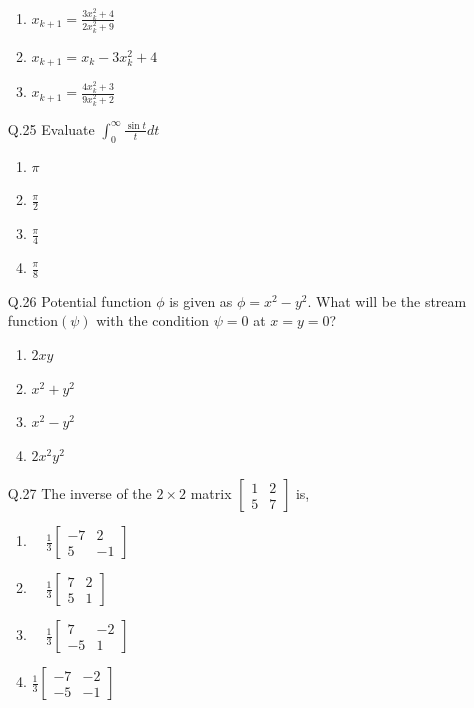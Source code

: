 \documentclass[journal,12pt,onecolumn]{IEEEtran}
\theoremstyle{remark}
\begin{document}
\begin{enumerate}
\begin{enumerate}
		\item $x_{k+1}=\frac{3x_k^2+4}{2x_k^2+9}$
		\item $x_{k+1}=x_k-3x_k^2+4$
		\item $x_{k+1}=\frac{4x_k^2+3}{9x_k^2+2}$
        \end{enumerate}   
\item[Q.25] Evaluate $\int_0^{\infty}\frac{\sin t}{t} dt$
	\begin{enumerate}
                \item $\pi$
		\item $\frac{\pi}{2}$
		\item $\frac{\pi}{4}$
		\item $\frac{\pi}{8}$  
        \end{enumerate}
\item[Q.26] Potential function $\phi$ is given as $\phi=x^2-y^2$. What will be the stream function$(\psi)$ with the condition $\psi=0$ at $x=y=0$?
	\begin{enumerate}
                \item $2xy$
                \item $x^2+y^2$
                \item $x^2-y^2$
                \item $2x^2y^2$  
        \end{enumerate}
\item[Q.27] The inverse of the $2 \times 2$  matrix $\begin{bmatrix} 1 & 2 \\ 5 & 7 \end{bmatrix}$ is,                                                 
                \begin{enumerate}
\item $\quad \frac{1}{3} \begin{bmatrix} -7 & 2 \\ 5 & -1 \end{bmatrix}$\\
\item $\quad \frac{1}{3} \begin{bmatrix} 7 & 2 \\ 5 & 1 \end{bmatrix}$\\
\item $\quad \frac{1}{3} \begin{bmatrix} 7 & -2 \\ -5 & 1 \end{bmatrix}$\\
\item $\frac{1}{3} \begin{bmatrix} -7 & -2 \\ -5 & -1 \end{bmatrix}$\\

\end{enumerate}
\end{enumerate}
\end{document}
